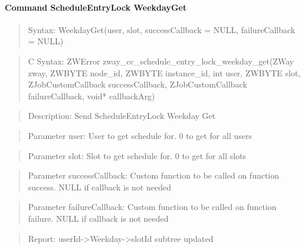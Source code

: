\paragraph{Command ScheduleEntryLock WeekdayGet}
\begin{quote}Syntax: WeekdayGet(user, slot, successCallback = NULL, failureCallback = NULL)\end{quote}
\begin{quote}C Syntax: ZWError zway\_cc\_schedule\_entry\_lock\_weekday\_get(ZWay zway, ZWBYTE node\_id, ZWBYTE instance\_id, int user, ZWBYTE slot, ZJobCustomCallback successCallback, ZJobCustomCallback failureCallback, void* callbackArg)\end{quote}
\begin{quote}Description: Send ScheduleEntryLock Weekday Get\end{quote}
\begin{quote}Parameter user: User to get schedule for. 0 to get for all users\end{quote}
\begin{quote}Parameter slot: Slot to get schedule for. 0 to get for all slots\end{quote}
\begin{quote}Parameter successCallback: Custom function to be called on function success. NULL if callback is not needed\end{quote}
\begin{quote}Parameter failureCallback: Custom function to be called on function failure. NULL if callback is not needed\end{quote}
\begin{quote}Report: userId->Weekday->slotId subtree updated\end{quote}

